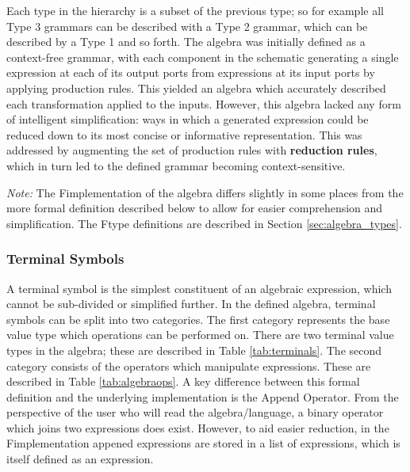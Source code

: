 Each type in the hierarchy is a subset of the previous type; so for example all Type 3 grammars can be described with a Type 2 grammar, which can be described by a Type 1 and so forth. The algebra was initially defined as a context-free grammar, with each component in the schematic generating a single expression at each of its output ports from expressions at its input ports by applying production rules. This yielded an algebra which accurately described each transformation applied to the inputs. However, this algebra lacked any form of intelligent simplification: ways in which a generated expression could be reduced down to its most concise or informative representation. This was addressed by augmenting the set of production rules with \textbf{reduction rules}, which in turn led to the defined grammar becoming context-sensitive.

\textit{Note:} The F\fsharp implementation of the algebra differs slightly in some places from the more formal definition described below to allow for easier comprehension and simplification. The F\fsharp type definitions are described in Section \ref{sec:algebra_types}.

\subsubsection{Terminal Symbols}
A terminal symbol is the simplest constituent of an algebraic expression, which cannot be sub-divided or simplified further. In the defined algebra, terminal symbols can be split into two categories. The first category represents the base value type which operations can be performed on. There are two terminal value types in the algebra; these are described in Table \ref{tab:terminals}. The second category consists of the operators which manipulate expressions. These are described in Table \ref{tab:algebraops}. A key difference between this formal definition and the underlying implementation is the Append Operator. From the perspective of the user who will read the algebra/language, a binary operator which joins two expressions does exist. However, to aid easier reduction, in the F\fsharp implementation appened expressions are stored in a list of expressions, which is itself defined as an expression.
\begin{table}[!ht]
    \centering
    \caption{Terminal Value Symbols}
    \label{tab:terminals}
\end{table}

